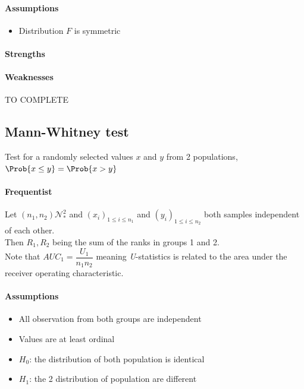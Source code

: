 \paragraph{Assumptions}
\begin{itemize}
    \item Distribution $F$ is symmetric
\end{itemize}

\paragraph{Strengths}
\paragraph{Weaknesses}

TO COMPLETE

\subsection{Mann-Whitney test}
Test for a randomly selected values $x$ and $y$ from 2 populations, $\Prob{x\leq y} = 
\Prob{x > y}$
\paragraph{Frequentist}
Let $(n_{1}, n_{2})\mathcal{N}_{*}^{2}$ and $\left(x_{i}\right)_{1\leq i\leq n_{1}}$
and $\left(y_{i}\right)_{1\leq i\leq n_{2}}$ both samples independent of each other.\\
Then
$R_{1}, R_{2}$ being the sum of the ranks in groups 1 and 2. \\
Note that $AUC_{1}=\dfrac{U_{1}}{n_{1}n_{2}}$ meaning \emph{U}-statistics is related to
the area under the receiver operating characteristic.


\paragraph{Assumptions}
\begin{itemize}
    \item All observation from both groups are independent
    \item Values are at least ordinal
    \item $H_{0}$: the distribution of both population is identical
    \item $H_{1}$: the 2 distribution of population are different
\end{itemize}

